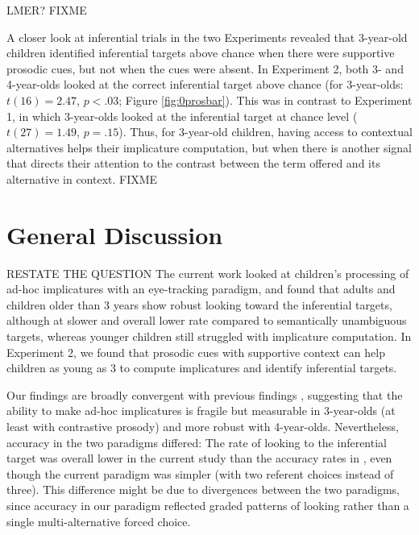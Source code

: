 \documentclass[10pt,letterpaper]{article}
\begin{document}
LMER? FIXME

A closer look at inferential trials in the two Experiments revealed that 3-year-old children identified inferential targets above chance when there were supportive prosodic cues, but not when the cues were absent. In Experiment 2, both 3- and 4-year-olds looked at the correct inferential target above chance (for 3-year-olds: $t(16) = 2.47$, $p < .03$; Figure \ref{fig:0prosbar}). This was in contrast to Experiment 1, in which 3-year-olds looked at the inferential target at chance level ($t(27) = 1.49$, $p = .15$). Thus, for 3-year-old children, having access to contextual alternatives helps their implicature computation, but when there is another signal that directs their attention to the contrast between the term offered and its alternative in context. FIXME

\section{General Discussion}

RESTATE THE QUESTION The current work looked at children's processing of ad-hoc implicatures with an eye-tracking paradigm, and found that adults and children older than 3 years show robust looking toward the inferential targets, although at slower and overall lower rate compared to semantically unambiguous targets, whereas younger children still struggled with implicature computation. In Experiment 2, we found that prosodic cues with supportive context can help children as young as 3 to compute implicatures and identify inferential targets.

Our findings are broadly convergent with previous findings \cite{stillerLLD}, suggesting that the ability to make ad-hoc implicatures is fragile but measurable in 3-year-olds (at least with contrastive prosody) and more robust with 4-year-olds. Nevertheless, accuracy in the two paradigms differed: The rate of looking to the inferential target was overall lower in the current study than the accuracy rates in , even though the current paradigm was simpler (with two referent choices instead of three). This difference might be due to divergences between the two paradigms, since accuracy in our paradigm reflected graded patterns of looking rather than a single multi-alternative forced choice. 
\end{document}
